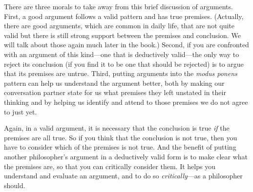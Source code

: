 \documentclass[oneside,letterpaper,12pt]{book}
\begin{document}
There are three morals to take away from this brief discussion of arguments. First, a good argument follows a valid pattern and has true premises. (Actually, there are good arguments, which are common in daily life, that are not quite valid but there is still strong support between the premises and conclusion. We will talk about those again much later in the book.) Second, if you are confronted with an argument of this kind---one that is deductively valid---the only way to reject its conclusion (if you find it to be one that should be rejected) is to argue that its premises are untrue. Third, putting arguments into the \emph{modus ponens} pattern can help us understand the argument better, both by making our conversation partner state for us what premises they left unstated in their thinking and by helping us identify and attend to those premises we do not agree to just yet.

Again, in a valid argument, it is necessary that the conclusion is true \textit{if} the premises are all true. So if you think that the conclusion is not true, then you have to consider which of the premises is not true. And the benefit of putting another philosopher's argument in a deductively valid form is to make clear what the premises are, so that you can critically consider them. It helps you understand and evaluate an argument, and to do so \textit{critically}---as a philosopher should.
\end{document}
